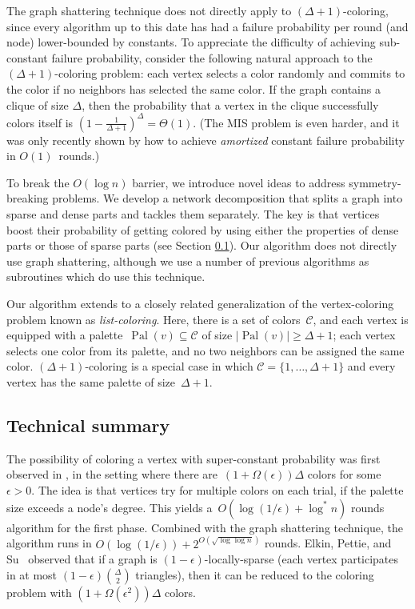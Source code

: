 \documentclass[11pt]{amsart}
\newcommand{\pal}{\operatorname{Pal}}
\begin{document}
\begin{enumerate}
The graph shattering technique does not directly apply to $(\Delta+1)$-coloring, since every algorithm up to this date has had a failure probability per round (and node) lower-bounded by constants. To appreciate the difficulty of achieving sub-constant failure probability, consider the following natural approach to the $(\Delta+1)$-coloring problem: each vertex selects a color randomly and commits to the color if no neighbors has selected the same color. If the graph contains a clique of size $\Delta$, then the probability that a vertex in the clique successfully colors itself is $(1-\frac{1}{\Delta+1})^{\Delta} = \Theta(1)$. (The MIS problem is even harder, and it was only recently shown by \cite{Moh16} how to achieve {\it amortized} constant  failure probability in $O(1)$~rounds.)

To break the $O(\log n)$ barrier, we introduce novel ideas to address symmetry-breaking problems. We develop a network decomposition that splits a graph into sparse and dense parts and tackles them separately. The key is that vertices boost their probability of getting colored by using either the properties of dense parts or those of sparse parts (see Section \ref{sec:technical}). Our algorithm does not directly use graph shattering, although we use a number of previous algorithms as subroutines which do use this technique.
\end{enumerate}

Our algorithm extends to a closely related generalization of the vertex-coloring problem known as \emph{list-coloring}. Here, there is a set of colors~$\mathcal C$, and each vertex is equipped with a palette~$\pal(v) \subseteq \mathcal C$ of size $|\pal(v)| \geq \Delta+1$; each vertex selects one color from its palette, and no two neighbors can be assigned the same color. $(\Delta+1)$-coloring is a special case in which $\mathcal C = \{1, \dots, \Delta + 1 \}$ and every vertex has the same palette of size~$\Delta+1$. 

\subsection{Technical summary}\label{sec:technical}


The possibility of coloring a vertex with super-constant probability was first observed in \cite{Sch10, elk15}, in the setting where there are~$(1+\Omega(\epsilon))\Delta$ colors for some~$\epsilon > 0$. The idea is that vertices try for multiple colors on each trial, if the palette size exceeds a node's degree. This yields a~$O(\log (1/\epsilon) + \log^{*} n)$ rounds algorithm for the first phase. Combined with the graph shattering technique, the algorithm runs in $O(\log (1/\epsilon)) + 2^{O(\sqrt{\log \log n})}$ rounds. Elkin, Pettie, and Su~\cite{elk15} observed that if a graph is $(1-\epsilon)$-locally-sparse (each vertex participates in at most $(1-\epsilon)\binom{\Delta}{2}$ triangles), then it can be reduced to the coloring problem with $(1+\Omega(\epsilon^2))\Delta$ colors.
\end{document}
